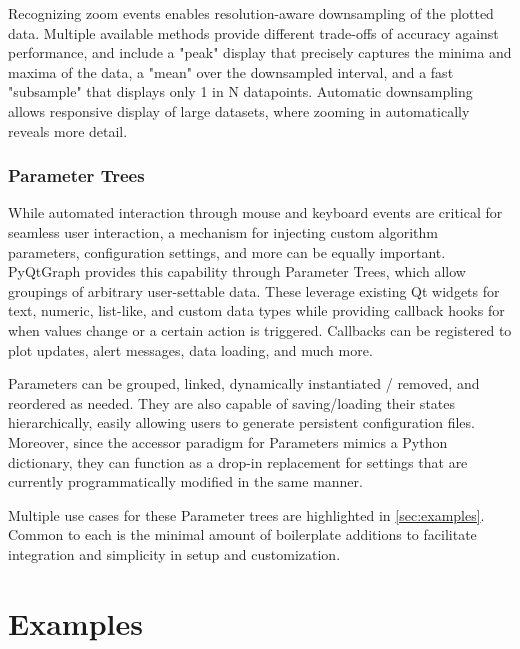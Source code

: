 \documentclass[journal]{vgtc}                %
\begin{document}
Recognizing zoom events enables resolution-aware downsampling of the plotted data. Multiple available methods provide different trade-offs of accuracy against performance, and include a "peak" display that precisely captures the minima and maxima of the data, a "mean" over the downsampled interval, and a fast "subsample" that displays only 1 in N datapoints. Automatic downsampling allows responsive display of large datasets, where zooming in automatically reveals more detail.

\subsubsection{Parameter Trees}\label{sec:paramtrees}
While automated interaction through mouse and keyboard events are critical for seamless user interaction, a mechanism for injecting custom algorithm parameters, configuration settings, and more can be equally important. PyQtGraph provides this capability through Parameter Trees, which allow groupings of arbitrary user-settable data. These leverage existing Qt widgets for text, numeric, list-like, and custom data types while providing callback hooks for when values change or a certain action is triggered. Callbacks can be registered to plot updates, alert messages, data loading, and much more.

Parameters can be grouped, linked, dynamically instantiated / removed, and reordered as needed. They are also capable of saving/loading their states hierarchically, easily allowing users to generate persistent configuration files. Moreover, since the accessor paradigm for Parameters mimics a Python dictionary, they can function as a drop-in replacement for settings that are currently programmatically modified in the same manner.

Multiple use cases for these Parameter trees are highlighted in \autoref{sec:examples}. Common to each is the minimal amount of boilerplate additions to facilitate integration and simplicity in setup and customization.


\section{Examples}\label{sec:examples}
\end{document}
